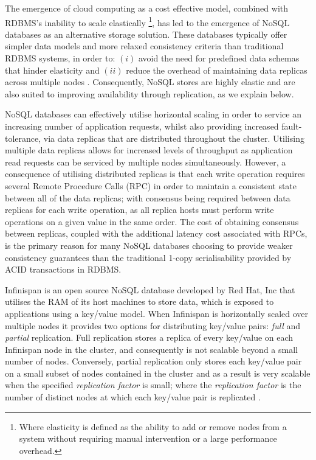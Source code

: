     The emergence of cloud computing as a cost effective model, combined with RDBMS's inability to scale elastically \footnote{Where elasticity is defined as the ability to add or remove nodes from a system without requiring manual intervention or a large performance overhead.}, has led to the emergence of NoSQL databases as an alternative storage solution.  These databases typically offer simpler data models and more relaxed consistency criteria than traditional RDBMS systems, in order to: $(i)$ avoid the need for predefined data schemas that hinder elasticity and $(ii)$ reduce the overhead of maintaining data replicas across multiple nodes \citep{Cattell:2011:SSN:1978915.1978919}.  Consequently, NoSQL stores are highly elastic and are also suited to improving availability through replication, as we explain below.  
    
    NoSQL databases can effectively utilise horizontal scaling in order to service an increasing number of application requests, whilst also providing increased fault-tolerance, via data replicas that are distributed throughout the cluster.  Utilising multiple data replicas allows for increased levels of throughput as application read requests can be serviced by multiple nodes simultaneously.  However, a consequence of utilising distributed replicas is that each write operation requires several Remote Procedure Calls (RPC) in order to maintain a consistent state between all of the data replicas; with consensus being required between data replicas for each write operation, as all replica hosts must perform write operations  on a given value in the same order.  The cost of obtaining consensus between replicas, coupled with the additional latency cost associated with RPCs, is the primary reason for many NoSQL databases choosing to provide weaker consistency guarantees than the traditional 1-copy serialisability provided by ACID transactions in RDBMS.  
    
    Infinispan \citep{Infinispan, marchioni2012infinispan} is an open source NoSQL database developed by Red Hat, Inc \citep{RedHat} that utilises the RAM of its host machines to store data, which is exposed to applications using a key/value model.  When Infinispan is horizontally scaled over multiple nodes it provides two options for distributing key/value pairs: \emph{full} and \emph{partial} replication.  Full replication stores a replica of every key/value on each Infinispan node in the cluster, and consequently is not scalable beyond a small number of nodes.  Conversely, partial replication only stores each key/value pair on a small subset of nodes contained in the cluster and as a result is very scalable when the specified \emph{replication factor} is small; where the \emph{replication factor} is the number of distinct nodes at which each key/value pair is replicated \citep{Schiper:2010:PGP:1915085.1916444}.  
    

